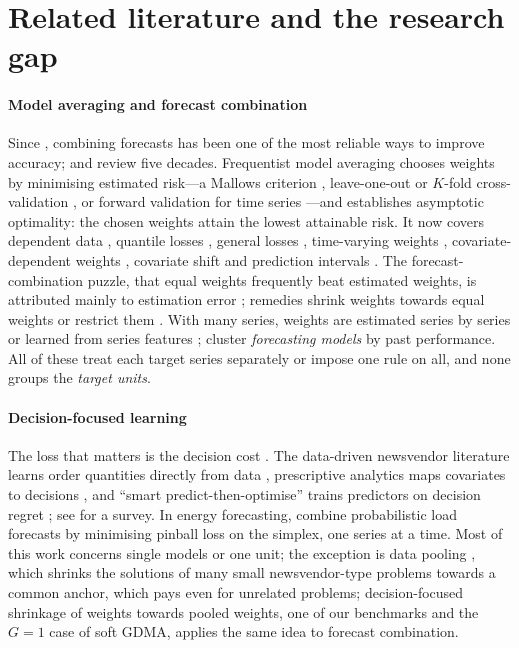 \section{Related literature and the research gap}\label{sec:lit}

\paragraph{Model averaging and forecast combination}
Since \citet{BatesGranger1969}, combining forecasts has been one of the most reliable ways to improve accuracy; \citet{Timmermann2006} and \citet{Wang2023review} review five decades.
Frequentist model averaging chooses weights by minimising estimated risk---a Mallows criterion \citep{Hansen2007}, leave-one-out or $K$-fold cross-validation \citep{HansenRacine2012,ZhangLiu2023}, or forward validation for time series \citep{ZhangZhang2023}---and establishes asymptotic optimality: the chosen weights attain the lowest attainable risk.
It now covers dependent data \citep{ZhangWanZou2013}, quantile losses \citep{LuSu2015}, general losses \citep{Yu2024unified}, time-varying weights \citep{Sun2021tvma}, covariate-dependent weights \citep{Gong2026moe}, covariate shift \citep{Zhang2026shift} and prediction intervals \citep{Qu2025intervals}.
The forecast-combination puzzle, that equal weights frequently beat estimated weights, is attributed mainly to estimation error \citep{SmithWallis2009,Claeskens2016}; remedies shrink weights towards equal weights \citep{DieboldShin2019} or restrict them \citep{Zou2025weights}.
With many series, weights are estimated series by series or learned from series features \citep[FFORMA,][]{MonteroManso2020}; \citet{AiolfiTimmermann2006} cluster \emph{forecasting models} by past performance.
All of these treat each target series separately or impose one rule on all, and none groups the \emph{target units}.

\paragraph{Decision-focused learning}
The loss that matters is the decision cost \citep{Granger1969}.
The data-driven newsvendor literature learns order quantities directly from data \citep{Levi2015,BanRudin2019}, prescriptive analytics maps covariates to decisions \citep{BertsimasKallus2020}, and ``smart predict-then-optimise'' trains predictors on decision regret \citep{ElmachtoubGrigas2022}; see \citet{Mandi2024} for a survey.
In energy forecasting, \citet{Wang2019cqra} combine probabilistic load forecasts by minimising pinball loss on the simplex, one series at a time.
Most of this work concerns single models or one unit; the exception is data pooling \citep{GuptaKallus2022}, which shrinks the solutions of many small newsvendor-type problems towards a common anchor, which pays even for unrelated problems; decision-focused shrinkage of weights towards pooled weights, one of our benchmarks and the $G=1$ case of soft GDMA, applies the same idea to forecast combination.

